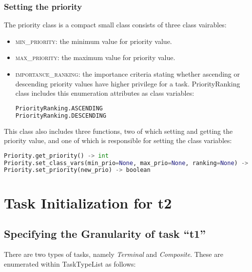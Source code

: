 \documentclass[]{scrartcl}
\begin{document}
\subsubsection{Setting the priority}
The priority class is a compact small class consists of three class vairables:
\begin{itemize}
    \item \textsc{min\_priority}: the minimum value for priority value.
    \item \textsc{max\_priority}: the maximum value for priority value.
    \item \textsc{importance\_ranking}: the importance criteria stating whether ascending or descending priority values have higher privilege for a task. \textsf{PriorityRanking} class includes this enumeration attributes
    as class variables:
    
\begin{lstlisting}[language=Python, frame=single, label={lst:t1PriorityRanking}, caption={The \textsf{PriorityRanking} enumeration.}]
PriorityRanking.ASCENDING
PriorityRanking.DESCENDING
\end{lstlisting}
        
\end{itemize}
        
This class also includes three functions, two of which setting and getting the priority value, and one of which is responsible for setting the class variables:

\begin{lstlisting}[language=Python, frame=single, label={lst:t1memberFunctionsPriority}, caption={The member functions for \textsf{Priority} module.}]
Priority.get_priority() -> int
Priority.set_class_vars(min_prio=None, max_prio=None, ranking=None) -> None (class method)
Priority.set_priority(new_prio) -> boolean
\end{lstlisting}
        
        
\section{Task Initialization for \textsf{t2}}
        
\subsection{Specifying the Granularity of task ``t1''}
There are two types of tasks, namely \emph{Terminal} and \emph{Composite}. These are enumerated within \textsf{TaskTypeList} as follows:
\end{document}
